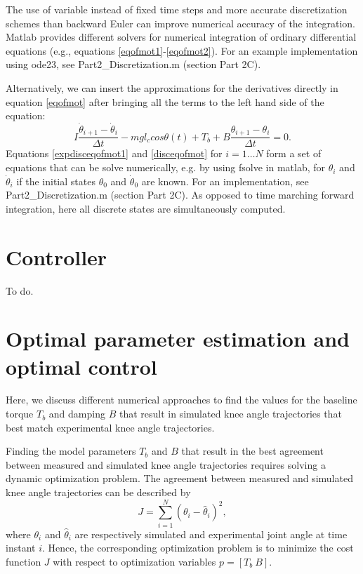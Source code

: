 \documentclass[
a4paper, %
11pt, %
onecolumn, %
openright, %
]{memoir}
\begin{document}
The use of variable instead of fixed time steps and more accurate discretization schemes than backward Euler can improve numerical accuracy of the integration. Matlab provides different solvers for numerical integration of ordinary differential equations (e.g., equations \ref{eqofmot1}-\ref{eqofmot2}). For an example implementation using ode23, see Part2\_Discretization.m (section Part 2C).

Alternatively, we can insert the approximations for the derivatives directly in equation \ref{eqofmot} after bringing all the terms to the left hand side of the equation:
\begin{equation}
I \frac{\dot\theta_{i+1} - \dot\theta_{i}}{\Delta t} - m g l_c cos\theta(t) + T_b + B \frac{\theta_{i+1} - \theta_{i}}{\Delta t} = 0.
\label{disceqofmot}
\end{equation}
Equations \ref{expdisceqofmot1} and \ref{disceqofmot} for $i = 1 \ldots N$ form a set of equations that can be solve numerically, e.g. by using fsolve in matlab, for $\theta_i$ and $\dot{\theta}_i$ if the initial states $\theta_0$ and $\dot{\theta}_0$ are known.  
For an implementation, see Part2\_Discretization.m (section Part 2C).
As opposed to time marching forward integration, here all discrete states are simultaneously computed. %


\chapter{Controller}

To do.

\chapter{Optimal parameter estimation and optimal control}

Here, we discuss different numerical approaches to find the values for the baseline torque $T_b$ and damping $B$ that result in simulated knee angle trajectories that best match experimental knee angle trajectories. 

Finding the model parameters $T_b$ and $B$ that result in the best agreement between measured and simulated knee angle trajectories requires solving a dynamic optimization problem. The agreement between measured and simulated knee angle trajectories can be described by
\begin{equation}
J = \sum_{i = 1}^{N} ( \theta_i - \hat{\theta}_i )^2,
\end{equation}
where $\theta_i$ and $\hat{\theta}_i$ are respectively simulated and experimental joint angle at time instant $i$. Hence, the corresponding optimization problem is to minimize the cost function $J$ with respect to optimization variables $ p = [T_b \: B]$. 
\end{document}
